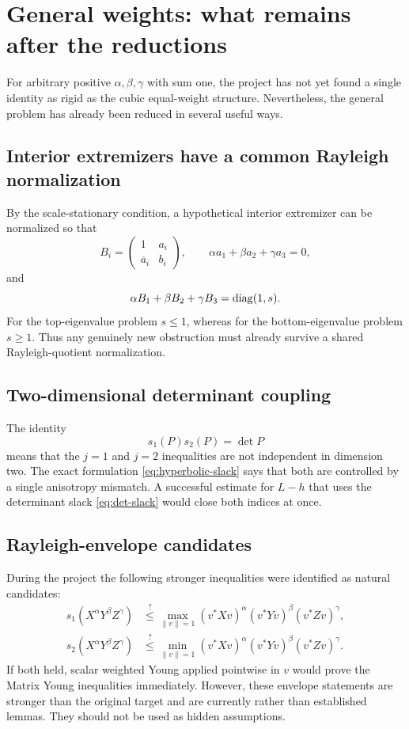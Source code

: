 \section{General weights: what remains after the reductions}

For arbitrary positive $\alpha,\beta,\gamma$ with sum one, the project has not yet found a single identity as rigid as the cubic equal-weight structure.  Nevertheless, the general problem has already been reduced in several useful ways.

\subsection{Interior extremizers have a common Rayleigh normalization}
By the scale-stationary condition, a hypothetical interior extremizer can be normalized so that
\[
B_i=\begin{pmatrix}1&a_i\\ \overline a_i&b_i\end{pmatrix},
\qquad
\alpha a_1+\beta a_2+\gamma a_3=0,
\]
and
\[
\alpha B_1+\beta B_2+\gamma B_3=\operatorname{diag}(1,s).
\]
For the top-eigenvalue problem $s\le1$, whereas for the bottom-eigenvalue problem $s\ge1$.  Thus any genuinely new obstruction must already survive a shared Rayleigh-quotient normalization.

\subsection{Two-dimensional determinant coupling}
The identity
\[
s_1(P)s_2(P)=\det P
\]
means that the $j=1$ and $j=2$ inequalities are not independent in dimension two.  The exact formulation \eqref{eq:hyperbolic-slack} says that both are controlled by a single anisotropy mismatch.  A successful estimate for $L-h$ that uses the determinant slack \eqref{eq:det-slack} would close both indices at once.

\subsection{Rayleigh-envelope candidates}
During the project the following stronger inequalities were identified as natural candidates:
\begin{align}
 s_1(X^\alpha Y^\beta Z^\gamma)
 &\stackrel{?}{\le}
 \max_{\|v\|=1}
 (v^*Xv)^\alpha(v^*Yv)^\beta(v^*Zv)^\gamma,
 \label{eq:Eplus}\\
 s_2(X^\alpha Y^\beta Z^\gamma)
 &\stackrel{?}{\le}
 \min_{\|v\|=1}
 (v^*Xv)^\alpha(v^*Yv)^\beta(v^*Zv)^\gamma.
 \label{eq:Eminus}
\end{align}
If both held, scalar weighted Young applied pointwise in $v$ would prove the Matrix Young inequalities immediately.  However, these envelope statements are stronger than the original target and are currently \statusW{} rather than established lemmas.  They should not be used as hidden assumptions.

